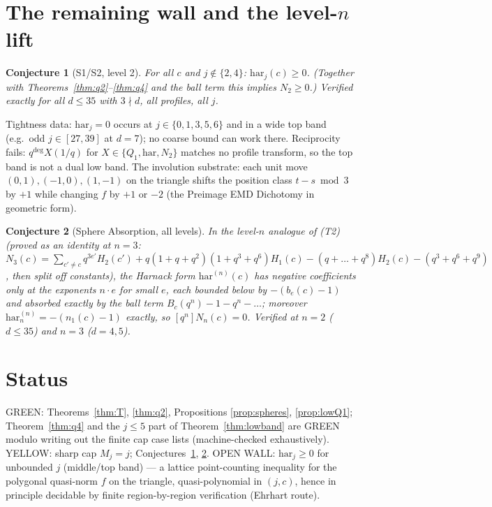 \documentclass[11pt]{article}
\newtheorem{conjecture}{Conjecture}
\begin{document}
\section{The remaining wall and the level-$n$ lift}

\begin{conjecture}[S1/S2, level 2]\label{conj:S}
For all $c$ and $j\notin\{2,4\}$: $\mathrm{har}_j(c) \geq 0$.
(Together with Theorems~\ref{thm:q2}--\ref{thm:q4} and the ball term this
implies $N_2 \geq 0$.) Verified exactly for all $d \leq 35$ with
$3\nmid d$, all profiles, all $j$.
\end{conjecture}

Tightness data: $\mathrm{har}_j = 0$ occurs at $j\in\{0,1,3,5,6\}$ and in
a wide top band (e.g.\ odd $j \in [27,39]$ at $d=7$); no coarse bound can
work there. Reciprocity fails: $q^{\deg}X(1/q)$ for
$X\in\{Q_1,\mathrm{har},N_2\}$ matches no profile transform, so the top
band is not a dual low band. The involution substrate: each unit move
$(0,1),(-1,0),(1,-1)$ on the triangle shifts the position class
$t-s \bmod 3$ by $+1$ while changing $f$ by $+1$ or $-2$ (the Preimage
EMD Dichotomy in geometric form).

\begin{conjecture}[Sphere Absorption, all levels]\label{conj:SA}
In the level-$n$ analogue of (T2) (proved as an identity at $n=3$:
$N_3(c) = \sum_{c'\neq c} q^{3e'}H_2(c') + q(1+q+q^2)(1+q^3+q^6)H_1(c) -
(q+\dots+q^8)H_2(c) - (q^3+q^6+q^9)$, then split off constants), the
Harnack form $\mathrm{har}^{(n)}(c)$ has negative coefficients only at
the exponents $n\cdot e$ for small $e$, each bounded below by
$-(b_e(c)-1)$ and absorbed exactly by the ball term $B_c(q^n)-1-q^n-\dots$;
moreover $\mathrm{har}^{(n)}_{n} = -(n_1(c)-1)$ exactly, so
$[q^n]N_n(c) = 0$. Verified at $n=2$ ($d\leq35$) and $n=3$ ($d=4,5$).
\end{conjecture}

\section*{Status}
GREEN: Theorems~\ref{thm:T}, \ref{thm:q2}, Propositions
\ref{prop:spheres}, \ref{prop:lowQ1}; Theorem~\ref{thm:q4} and the
$j\leq5$ part of Theorem~\ref{thm:lowband} are GREEN modulo writing out
the finite cap case lists (machine-checked exhaustively).
YELLOW: sharp cap $M_j = j$; Conjectures~\ref{conj:S}, \ref{conj:SA}.
OPEN WALL: $\mathrm{har}_j \geq 0$ for unbounded $j$ (middle/top band) —
a lattice point-counting inequality for the polygonal quasi-norm $f$ on
the triangle, quasi-polynomial in $(j,c)$, hence in principle decidable
by finite region-by-region verification (Ehrhart route).
\end{document}
